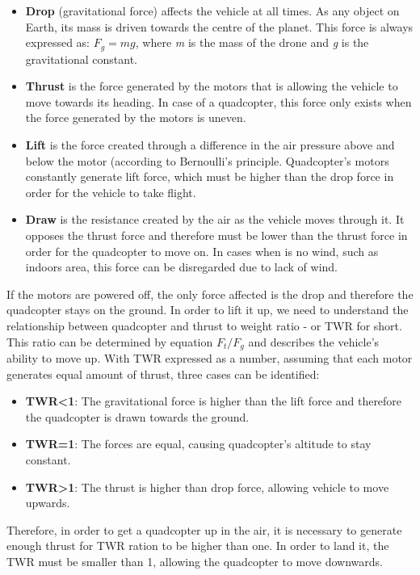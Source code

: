 \begin{itemize}
  \item \textbf{Drop} (gravitational force) affects the vehicle at all times. As any object on Earth, its mass is driven towards the centre of the planet. This force is always expressed as: $F_g = mg$, where \textit{m} is the mass of the drone and \textit{g} is the gravitational constant.
  \item \textbf{Thrust} is the force generated by the motors that is allowing the vehicle to move towards its heading. In case of a quadcopter, this force only exists when the force generated by the motors is uneven.
  \item \textbf{Lift} is the force created through a difference in the air pressure above and below the motor (according to Bernoulli's principle. Quadcopter's motors constantly generate lift force, which must be higher than the drop force in order for the vehicle to take flight.
  \item \textbf{Draw} is the resistance created by the air as the vehicle moves through it. It opposes the thrust force and therefore must be lower than the thrust force in order for the quadcopter to move on. In cases when is no wind, such as indoors area, this force can be disregarded due to lack of wind.
\end{itemize} 

If the motors are powered off, the only force affected is the drop and therefore the quadcopter stays on the ground. In order to lift it up, we need to understand the relationship between quadcopter and thrust to weight ratio - or TWR for short. This ratio can be determined by equation $F_t/F_g$ and describes the vehicle's ability to move up. With TWR expressed as a number, assuming that each motor generates equal amount of thrust, three cases can be identified:

\begin{itemize}
\item \textbf{TWR<1}: The gravitational force is higher than the lift force and therefore the quadcopter is drawn towards the ground.
\item \textbf{TWR=1}: The forces are equal, causing quadcopter's altitude to stay constant.
\item \textbf{TWR>1}: The thrust is higher than drop force, allowing vehicle to move upwards.
\end{itemize}

Therefore, in order to get a quadcopter up in the air, it is necessary to generate enough thrust for TWR ration to be higher than one. In order to land it, the TWR must be smaller than 1, allowing the quadcopter to move downwards.

